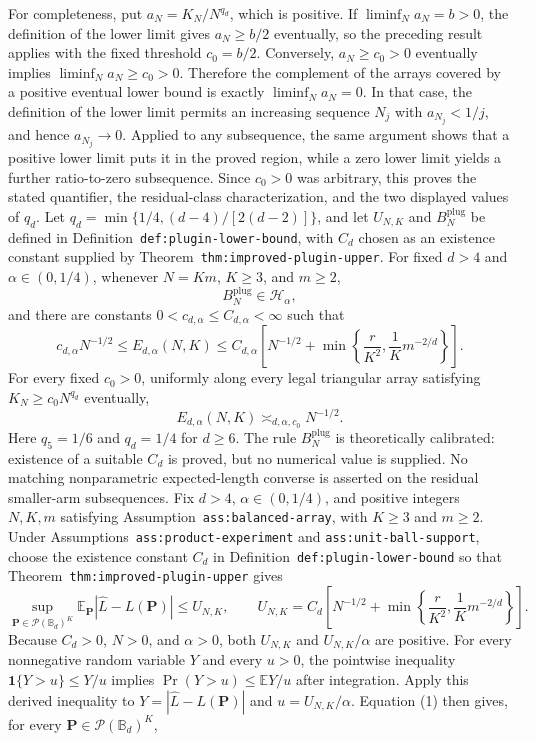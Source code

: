 For completeness, put \(a_N=K_N/N^{q_d}\), which is positive.  If \(\liminf_Na_N=b>0\), the definition of the lower limit gives \(a_N\ge b/2\) eventually, so the preceding result applies with the fixed threshold \(c_0=b/2\).  Conversely, \(a_N\ge c_0>0\) eventually implies \(\liminf_Na_N\ge c_0>0\).  Therefore the complement of the arrays covered by a positive eventual lower bound is exactly \(\liminf_Na_N=0\).  In that case, the definition of the lower limit permits an increasing sequence \(N_j\) with \(a_{N_j}<1/j\), and hence \(a_{N_j}\to0\).  Applied to any subsequence, the same argument shows that a positive lower limit puts it in the proved region, while a zero lower limit yields a further ratio-to-zero subsequence.  Since \(c_0>0\) was arbitrary, this proves the stated quantifier, the residual-class characterization, and the two displayed values of \(q_d\).
Let \(q_d=\min\{1/4,(d-4)/[2(d-2)]\}\), and let \(U_{N,K}\) and \(B_N^{\mathrm{plug}}\) be defined in Definition~\texttt{def:plugin-lower-bound}, with \(C_d\) chosen as an existence constant supplied by Theorem~\texttt{thm:improved-plugin-upper}.  For fixed \(d>4\) and \(\alpha\in(0,1/4)\), whenever \(N=Km\), \(K\ge3\), and \(m\ge2\),
\[
B_N^{\mathrm{plug}}\in\mathcal H_\alpha,
\]
and there are constants \(0<c_{d,\alpha}\le C_{d,\alpha}<\infty\) such that
\[
c_{d,\alpha}N^{-1/2}
\le E_{d,\alpha}(N,K)
\le C_{d,\alpha}\left[N^{-1/2}+\min\left\{\frac r{K^2},\frac1K m^{-2/d}\right\}\right].
\]
For every fixed \(c_0>0\), uniformly along every legal triangular array satisfying \(K_N\ge c_0N^{q_d}\) eventually,
\[
E_{d,\alpha}(N,K)\asymp_{d,\alpha,c_0}N^{-1/2}.
\]
Here \(q_5=1/6\) and \(q_d=1/4\) for \(d\ge6\).  The rule \(B_N^{\mathrm{plug}}\) is theoretically calibrated: existence of a suitable \(C_d\) is proved, but no numerical value is supplied.  No matching nonparametric expected-length converse is asserted on the residual smaller-arm subsequences.
Fix \(d>4\), \(\alpha\in(0,1/4)\), and positive integers \(N,K,m\) satisfying Assumption~\texttt{ass:balanced-array}, with \(K\ge3\) and \(m\ge2\).  Under Assumptions~\texttt{ass:product-experiment} and \texttt{ass:unit-ball-support}, choose the existence constant \(C_d\) in Definition~\texttt{def:plugin-lower-bound} so that Theorem~\texttt{thm:improved-plugin-upper} gives
\[
\sup_{\mathbf P\in\mathcal P(\mathbb B_d)^K}
\mathbb E_{\mathbf P}|\widehat L-L(\mathbf P)|
\le U_{N,K},
\qquad
U_{N,K}=C_d\left[N^{-1/2}+
\min\left\{\frac r{K^2},\frac1K m^{-2/d}\right\}\right].
\tag{1}
\]
Because \(C_d>0\), \(N>0\), and \(\alpha>0\), both \(U_{N,K}\) and \(U_{N,K}/\alpha\) are positive.  For every nonnegative random variable \(Y\) and every \(u>0\), the pointwise inequality \(\mathbf 1\{Y>u\}\le Y/u\) implies \(\Pr(Y>u)\le\mathbb EY/u\) after integration.  Apply this derived inequality to \(Y=|\widehat L-L(\mathbf P)|\) and \(u=U_{N,K}/\alpha\).  Equation (1) then gives, for every \(\mathbf P\in\mathcal P(\mathbb B_d)^K\),
